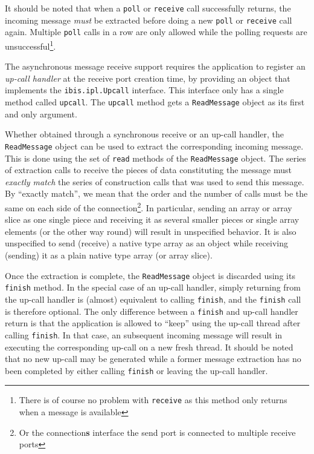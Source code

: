 \documentclass[11pt]{book}
\begin{document}
It should be noted that when a \texttt{poll} or \texttt{receive} call
successfully returns, the incoming message \emph{must} be extracted
before doing a new \texttt{poll} or \texttt{receive} call again.
Multiple \texttt{poll} calls in a row are only allowed while the
polling requests are unsuccessful\footnote{There is of course no
  problem with \texttt{receive} as this method only returns when a
  message is available}.

The asynchronous message receive support requires the application to
register an \emph{up-call handler} at the receive port creation time,
by providing an object that implements the \texttt{ibis.ipl.Upcall}
interface. This interface only has a single method called
\texttt{upcall}. The \texttt{upcall} method gets a
\texttt{ReadMessage} object as its first and only argument.

Whether obtained through a synchronous receive or an up-call handler,
the \texttt{ReadMessage} object can be used to extract the
corresponding incoming message. This is done using the set of
\texttt{read} methods of the \texttt{ReadMessage} object. The series
of extraction calls to receive the pieces of data constituting the
message must \emph{exactly match} the series of construction calls
that was used to send this message. By ``exactly match'', we mean that
the order and the number of calls must be the same on each side of the
connection\footnote{Or the connection\textbf{s} interface the send
  port is connected to multiple receive ports}. In particular, sending
an array or array slice as one single piece and receiving it as
several smaller pieces or single array elements (or the other way
round) will result in unspecified behavior. It is also unspecified to
send (receive) a native type array as an object while receiving
(sending) it as a plain native type array (or array slice).

Once the extraction is complete, the \texttt{ReadMessage} object is
discarded using its \texttt{finish} method. In the special case of an
up-call handler, simply returning from the up-call handler is (almost) equivalent
to calling \texttt{finish}, and the \texttt{finish} call is therefore
optional. The only difference between a \texttt{finish} and up-call
handler return is that the application is allowed to ``keep'' using
the up-call thread after calling \texttt{finish}. In that case, an
subsequent incoming message will result in executing the corresponding
up-call on a new fresh thread. It should be noted that no new up-call
may be generated while a former message extraction has no been
completed by either calling \texttt{finish} or leaving the up-call
handler.
\end{document}
